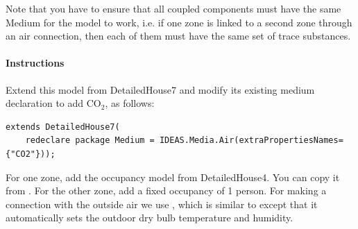 \documentclass[10pt,a4paper]{article}
\begin{document}
Note that you have to ensure that all coupled components must have the same Medium
for the model to work, i.e. if one zone is linked to a second zone through an air connection,
then each of them must have the same set of trace substances.

\newpage

\paragraph{Instructions}
Extend this model from DetailedHouse7 and modify its existing medium declaration
to add CO$_2$, as follows:
\begin{verbatim}
extends DetailedHouse7(
    redeclare package Medium = IDEAS.Media.Air(extraPropertiesNames={"CO2"}));
\end{verbatim}
For one zone, add the occupancy model from DetailedHouse4. 
You can copy it from .
For the other zone, add a fixed occupancy of 1 person. For making a connection with the outside air we use ,
which is similar to  except that it 
automatically sets the outdoor dry bulb temperature and humidity. \\
\end{document}
